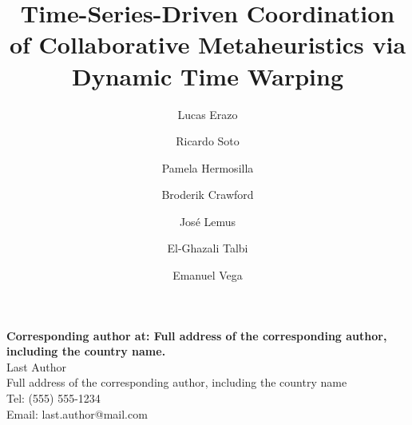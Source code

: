 \documentclass[review]{elsarticle}
\begin{document}
\begin{frontmatter}
\begin{titlepage}
\begin{center}
\begin{flushleft}
\vspace{1cm}
\textbf{Corresponding author at: Full address of the corresponding author, including the country name.} \\
Last Author \\
Full address of the corresponding author, including the country name \\
Tel: (555) 555-1234 \\
Email: last.author@mail.com

\end{flushleft}        
\end{center}
\end{titlepage}

\title{Time-Series-Driven Coordination of Collaborative Metaheuristics via Dynamic Time Warping}

\author[label1,label2]{Lucas Erazo}

\author[label1]{Ricardo Soto}

\author[label1]{Pamela Hermosilla}

\author[label1]{Broderik Crawford}

\author[label2]{José Lemus}

\author[label3]{El-Ghazali Talbi}

\author[label1]{Emanuel Vega}



\address[label1]{Escuela de Ingeniería Informática, Pontificia Universidad Católica de Valparaíso, Valparaíso 2362807, Chile}
\address[label2]{Escuela de Ingeniería de Construcción y Transporte, Pontificia Universidad Católica de Valparaíso, Valparaíso 2362804, Chile}
\address[label3]{University of Lille \& INRIA, UMR 9189 CRIStAL, Lille, France}




\end{frontmatter}
\end{document}
